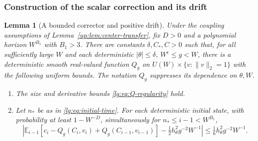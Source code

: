 \documentclass[11pt]{article}
\numberwithin{equation}{section}
\newtheorem{lemma}[theorem]{Lemma}
\theoremstyle{remark}
\newcommand{\E}{\mathbb E}
\begin{document}
\subsubsection{Construction of the scalar correction and its drift}
\label{lg:sec:cocycle-correction}
\label{lg:sec:define-Q}
\label{lg:sec:prove-Q}

\begin{lemma}[A bounded corrector and positive drift]\label{lg:lem:centerQ}
Under the coupling assumptions of Lemma~\ref{up:lem:center-transfer}, fix $D>0$
and a polynomial horizon $W^{B_1}$ with $B_1>3$.
There are constants $\delta,C_*,C>0$ such that, for all sufficiently
large $W$ and each deterministic $|\theta|\le\delta$, $W^\epsilon\le g<W$,
there is a deterministic smooth real-valued function $Q_g$ on
$U(W)\times\{v:\|v\|_2=1\}$ with the following uniform bounds.
The notation $Q_g$ suppresses its dependence on $\theta,W$.
\begin{enumerate}
\item The size and derivative bounds \eqref{lg:eq:Q-regularity} hold.
\item Let $n_*$ be as in \eqref{lg:eq:initial-time}.
For each deterministic initial state, with probability at least $1-W^{-D}$,
simultaneously for $n_*\le i-1<W^{B_1}$,
\begin{equation}\label{lg:eq:corrected-drift}
 \left|\E_{i-1}[c_i-Q_g(C_i,v_i)+Q_g(C_{i-1},v_{i-1})]
       -\tfrac12h_\theta^2g^{-2}W^{-1}\right|
 \le\tfrac16h_\theta^2g^{-2}W^{-1}.
\end{equation}
\end{enumerate}
 
\end{lemma}
\end{document}
